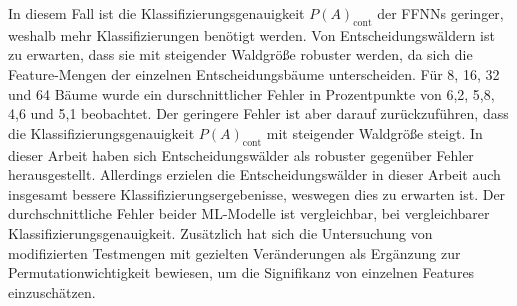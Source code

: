 In diesem Fall ist die Klassifizierungsgenauigkeit $P(A)_{\text{cont}}$ der FFNNs geringer, weshalb mehr Klassifizierungen benötigt werden.
\newline
\newline
Von Entscheidungswäldern ist zu erwarten, dass sie mit steigender Waldgröße robuster werden, da sich die Feature-Mengen der einzelnen Entscheidungsbäume unterscheiden.
Für 8, 16, 32 und 64 Bäume wurde ein durschnittlicher Fehler in Prozentpunkte von 6,2, 5,8, 4,6 und 5,1 beobachtet.
Der geringere Fehler ist aber darauf zurückzuführen, dass die Klassifizierungsgenauigkeit $P(A)_{\text{cont}}$ mit steigender Waldgröße steigt.
\newline
\newline
In dieser Arbeit haben sich Entscheidungswälder als robuster gegenüber Fehler herausgestellt.
Allerdings erzielen die Entscheidungswälder in dieser Arbeit auch insgesamt bessere Klassifizierungsergebenisse, weswegen dies zu erwarten ist.
Der durchschnittliche Fehler beider ML-Modelle ist vergleichbar, bei vergleichbarer Klassifizierungsgenauigkeit.
Zusätzlich hat sich die Untersuchung von modifizierten Testmengen mit gezielten Veränderungen als Ergänzung zur Permutationwichtigkeit bewiesen,
um die Signifikanz von einzelnen Features einzuschätzen.
